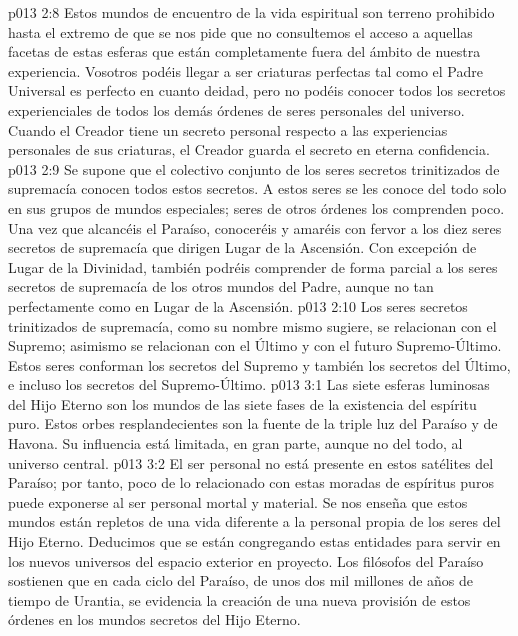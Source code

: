 \vs p013 2:8 Estos mundos de encuentro de la vida espiritual son terreno prohibido hasta el extremo de que se nos pide que no consultemos el acceso a aquellas facetas de estas esferas que están completamente fuera del ámbito de nuestra experiencia. Vosotros podéis llegar a ser criaturas perfectas tal como el Padre Universal es perfecto en cuanto deidad, pero no podéis conocer todos los secretos experienciales de todos los demás órdenes de seres personales del universo. Cuando el Creador tiene un secreto personal respecto a las experiencias personales de sus criaturas, el Creador guarda el secreto en eterna confidencia.
\vs p013 2:9 \pc Se supone que el colectivo conjunto de los seres secretos trinitizados de supremacía conocen todos estos secretos. A estos seres se les conoce del todo solo en sus grupos de mundos especiales; seres de otros órdenes los comprenden poco. Una vez que alcancéis el Paraíso, conoceréis y amaréis con fervor a los diez seres secretos de supremacía que dirigen Lugar de la Ascensión. Con excepción de Lugar de la Divinidad, también podréis comprender de forma parcial a los seres secretos de supremacía de los otros mundos del Padre, aunque no tan perfectamente como en Lugar de la Ascensión.
\vs p013 2:10 Los seres secretos trinitizados de supremacía, como su nombre mismo sugiere, se relacionan con el Supremo; asimismo se relacionan con el Último y con el futuro Supremo\hyp{}Último. Estos seres conforman los secretos del Supremo y también los secretos del Último, e incluso los secretos del Supremo\hyp{}Último.
\vs p013 3:1 Las siete esferas luminosas del Hijo Eterno son los mundos de las siete fases de la existencia del espíritu puro. Estos orbes resplandecientes son la fuente de la triple luz del Paraíso y de Havona. Su influencia está limitada, en gran parte, aunque no del todo, al universo central.
\vs p013 3:2 El ser personal no está presente en estos satélites del Paraíso; por tanto, poco de lo relacionado con estas moradas de espíritus puros puede exponerse al ser personal mortal y material. Se nos enseña que estos mundos están repletos de una vida diferente a la personal propia de los seres del Hijo Eterno. Deducimos que se están congregando estas entidades para servir en los nuevos universos del espacio exterior en proyecto. Los filósofos del Paraíso sostienen que en cada ciclo del Paraíso, de unos dos mil millones de años de tiempo de Urantia, se evidencia la creación de una nueva provisión de estos órdenes en los mundos secretos del Hijo Eterno.
